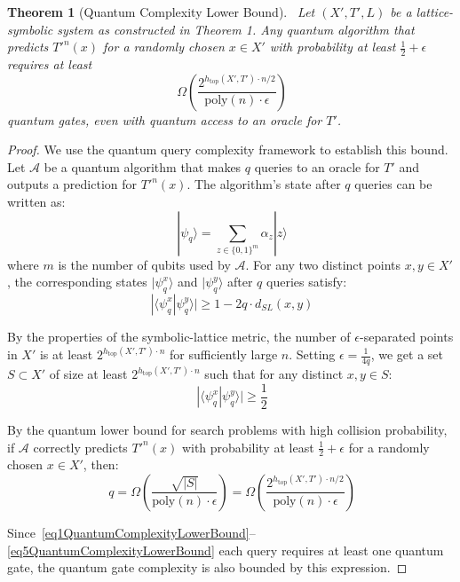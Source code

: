 \documentclass[12pt,a4paper]{article}
\newtheorem{theorem}{Theorem}[section]
\begin{document}
\begin{theorem}[Quantum Complexity Lower Bound]~\label{QuantumComplexityLowerBound}
Let $(X', T', L)$ be a lattice-symbolic system as constructed in Theorem 1. Any quantum algorithm that predicts $T'^n(x)$ for a randomly chosen $x \in X'$ with probability at least $\frac{1}{2} + \epsilon$ requires at least
\begin{equation}~\label{eq1QuantumComplexityLowerBound}
\Omega\left(\frac{2^{h_{\text{top}}(X',T') \cdot n/2}}{\text{poly}(n) \cdot \epsilon}\right)
\end{equation}
quantum gates, even with quantum access to an oracle for $T'$.
\end{theorem}

\begin{proof}
We use the quantum query complexity framework to establish this bound. Let $\mathcal{A}$ be a quantum algorithm that makes $q$ queries to an oracle for $T'$ and outputs a prediction for $T'^n(x)$. The algorithm's state after $q$ queries can be written as:
\begin{equation}~\label{eq2QuantumComplexityLowerBound}
|\psi_q\rangle = \sum_{z \in \{0,1\}^m} \alpha_z |z\rangle
\end{equation}
where $m$ is the number of qubits used by $\mathcal{A}$. For any two distinct points $x, y \in X'$, the corresponding states $|\psi_q^x\rangle$ and $|\psi_q^y\rangle$ after $q$ queries satisfy:
\begin{equation}~\label{eq3QuantumComplexityLowerBound}
|\langle \psi_q^x | \psi_q^y \rangle| \geq 1 - 2q \cdot d_{SL}(x, y)
\end{equation}

By the properties of the symbolic-lattice metric, the number of $\epsilon$-separated points in $X'$ is at least $2^{h_{\text{top}}(X',T') \cdot n}$ for sufficiently large $n$. Setting $\epsilon = \frac{1}{4q}$, we get a set $S \subset X'$ of size at least $2^{h_{\text{top}}(X',T') \cdot n}$ such that for any distinct $x, y \in S$:
\begin{equation}~\label{eq4QuantumComplexityLowerBound}
|\langle \psi_q^x | \psi_q^y \rangle| \geq \frac{1}{2}
\end{equation}

By the quantum lower bound for search problems with high collision probability, if $\mathcal{A}$ correctly predicts $T'^n(x)$ with probability at least $\frac{1}{2} + \epsilon$ for a randomly chosen $x \in X'$, then:
\begin{equation}~\label{eq5QuantumComplexityLowerBound}
q = \Omega\left(\frac{\sqrt{|S|}}{\text{poly}(n) \cdot \epsilon}\right) = \Omega\left(\frac{2^{h_{\text{top}}(X',T') \cdot n/2}}{\text{poly}(n) \cdot \epsilon}\right)
\end{equation}

Since~\eqref{eq1QuantumComplexityLowerBound}--\eqref{eq5QuantumComplexityLowerBound} each query requires at least one quantum gate, the quantum gate complexity is also bounded by this expression.
\end{proof}
\end{document}
